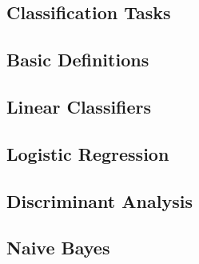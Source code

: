 

\subsection{Classification Tasks}


\subsection{Basic Definitions}


\subsection{Linear Classifiers}


\subsection{Logistic Regression}


\subsection{Discriminant Analysis}


\subsection{Naive Bayes}

